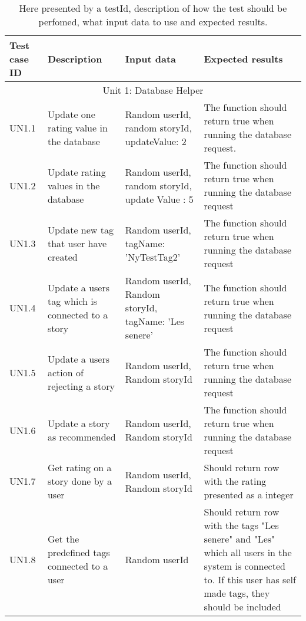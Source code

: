 {\renewcommand{\arraystretch}{2}%
\begin{longtable}{ | p{1.5cm} | p{6.5cm} | p{3cm} | p{6.5cm} |}
\caption[Unit Test cases]{ Here presented by a testId, description of how the test should be perfomed, what input data to use and expected results.} \label{Tab_unittestcases}\\

\hline {\bf Test case ID} & {\bf Description} & {\bf Input data} & {\bf Expected results} \\ \hline

\multicolumn{4}{c}{Unit 1: Database Helper}	\\\hline
			
			UN1.1 & Update one rating value in the database & Random userId, random storyId, updateValue: 2 & The function should return true when running the database request. \\\hline
			
			UN1.2 & Update rating values in the database & Random userId, random storyId, update Value : 5 & The function should return true when running the database request\\\hline
			
			UN1.3 & Update new tag that user have created & Random userId, tagName: 'NyTestTag2' & The function should return true when running the database request\\\hline
			
			UN1.4 & Update a users tag which is connected to a story & Random userId, Random storyId, tagName: 'Les senere' & The function should return true when running the database request \\\hline
			
			UN1.5 & Update a users action of rejecting a story & Random userId, Random storyId & The function should return true when running the database request  \\\hline
			
			UN1.6 & Update a story as recommended & Random userId, Random storyId & The function should return true when running the database request \\\hline
			
			UN1.7 & Get rating on a story done by a user  & Random userId, Random storyId & Should return row with the rating presented as a integer  \\ \hline			
		
			UN1.8 & Get the predefined tags connected to a user & Random userId & Should return row with the tags "Les senere" and "Les" which all users in the system is connected to. If this user has self made tags, they should be included \\ \hline
			

\end{longtable}}
